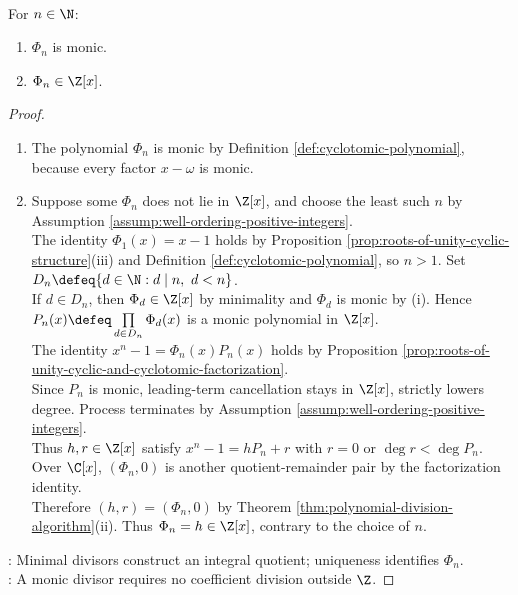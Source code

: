 \begin{proposition} \label{prop:cyclotomic-polynomials-integer-coefficients} \\
For $n\in\N$:
\begin{enumerate}[label=(\roman*)]
\setlength{\itemsep}{0pt}
\item $\Phi_n$ is monic.
\item $\Phi_n\in\Z[x]$.
\end{enumerate}
\begin{proof}
\begin{enumerate}[label=(\roman*)]
\setlength{\itemsep}{0pt}
\item The polynomial $\Phi_n$ is monic by Definition \ref{def:cyclotomic-polynomial}, because every factor $x-\omega$ is monic.
\item Suppose some $\Phi_n$ does not lie in $\Z[x]$, and choose the least such $n$ by Assumption \ref{assump:well-ordering-positive-integers}.\\
The identity $\Phi_1(x)=x-1$ holds by Proposition \ref{prop:roots-of-unity-cyclic-structure}(iii) and Definition \ref{def:cyclotomic-polynomial}, so $n>1$. Set $D_n\defeq\{d\in\N:d\mid n,\ d<n\}$.\\
If $d\in D_n$, then $\Phi_d\in\Z[x]$ by minimality and $\Phi_d$ is monic by (i). Hence $P_n(x)\defeq\prod\limits_{d\in D_n}\Phi_d(x)$ is a monic polynomial in $\Z[x]$.\\
The identity $x^n-1=\Phi_n(x)P_n(x)$ holds by Proposition \ref{prop:roots-of-unity-cyclic-and-cyclotomic-factorization}.\\
Since $P_n$ is monic, leading-term cancellation stays in $\Z[x]$, strictly lowers degree. Process terminates by Assumption \ref{assump:well-ordering-positive-integers}.\\
Thus $h,r\in\Z[x]$ satisfy $x^n-1=hP_n+r$ with $r=0$ or $\deg r<\deg P_n$.\\
Over $\C[x]$, $(\Phi_n,0)$ is another quotient-remainder pair by the factorization identity.\\
Therefore $(h,r)=(\Phi_n,0)$ by Theorem \ref{thm:polynomial-division-algorithm}(ii). Thus $\Phi_n=h\in\Z[x]$, contrary to the choice of $n$.
\end{enumerate}
: Minimal divisors construct an integral quotient; uniqueness identifies $\Phi_n$.\\
: A monic divisor requires no coefficient division outside $\Z$.
\end{proof}
\end{proposition}


